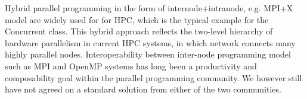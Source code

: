 Hybrid parallel programming in the form of internode+intranode, e.g. MPI+X model are widely used for 
for HPC, which is the typical example for the Concurrent class. 
This hybrid approach reflects the two-level hierarchy of hardware parallelism 
in current HPC systems, in which network connects many highly parallel nodes.
Interoperability between inter-node programming model such as MPI and OpenMP 
systems has long been a productivity and composability goal within
the parallel programming community. We however still have not agreed on a 
standard solution from either of the two communities. 


